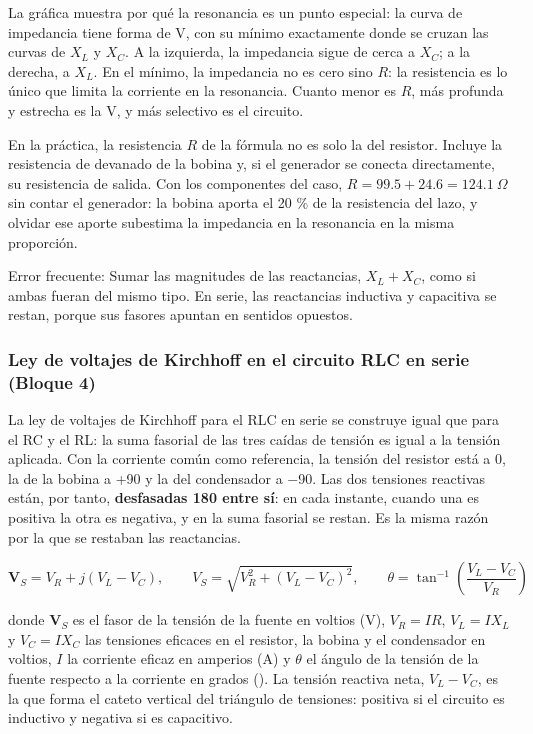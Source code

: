 \documentclass[11pt,letterpaper]{article}
\begin{document}
La gráfica muestra por qué la resonancia es un punto especial: la curva de impedancia tiene forma de V, con su mínimo exactamente donde se cruzan las curvas de $X_L$ y $X_C$. A la izquierda, la impedancia sigue de cerca a $X_C$; a la derecha, a $X_L$. En el mínimo, la impedancia no es cero sino $R$: la resistencia es lo único que limita la corriente en la resonancia. Cuanto menor es $R$, más profunda y estrecha es la V, y más selectivo es el circuito.

En la práctica, la resistencia $R$ de la fórmula no es solo la del resistor. Incluye la resistencia de devanado de la bobina y, si el generador se conecta directamente, su resistencia de salida. Con los componentes del caso, $R = 99.5 + 24.6 = 124.1\ \Omega$ sin contar el generador: la bobina aporta el 20 \% de la resistencia del lazo, y olvidar ese aporte subestima la impedancia en la resonancia en la misma proporción.

\begin{nota}{Error frecuente:}
Sumar las magnitudes de las reactancias, $X_L + X_C$, como si ambas fueran del mismo tipo. En serie, las reactancias inductiva y capacitiva se restan, porque sus fasores apuntan en sentidos opuestos.
\end{nota}

\subsubsection{Ley de voltajes de Kirchhoff en el circuito RLC en serie (Bloque 4)}

La ley de voltajes de Kirchhoff para el RLC en serie se construye igual que para el RC y el RL: la suma fasorial de las tres caídas de tensión es igual a la tensión aplicada. Con la corriente común como referencia, la tensión del resistor está a 0\textdegree{}, la de la bobina a +90\textdegree{} y la del condensador a \ensuremath{-}90\textdegree{}. Las dos tensiones reactivas están, por tanto, \textbf{desfasadas 180\textdegree{} entre sí}: en cada instante, cuando una es positiva la otra es negativa, y en la suma fasorial se restan. Es la misma razón por la que se restaban las reactancias.

\begin{equation}
  \mathbf{V}_S = V_R + j(V_L - V_C), \qquad V_S = \sqrt{V_R^{2} + (V_L - V_C)^{2}}, \qquad \theta = \tan^{-1}\!\left(\frac{V_L - V_C}{V_R}\right)
\end{equation}

donde $\mathbf{V}_S$ es el fasor de la tensión de la fuente en voltios (V), $V_R = IR$, $V_L = IX_L$ y $V_C = IX_C$ las tensiones eficaces en el resistor, la bobina y el condensador en voltios, $I$ la corriente eficaz en amperios (A) y $\theta$ el ángulo de la tensión de la fuente respecto a la corriente en grados (\textdegree{}). La tensión reactiva neta, $V_L - V_C$, es la que forma el cateto vertical del triángulo de tensiones: positiva si el circuito es inductivo y negativa si es capacitivo.
\end{document}
